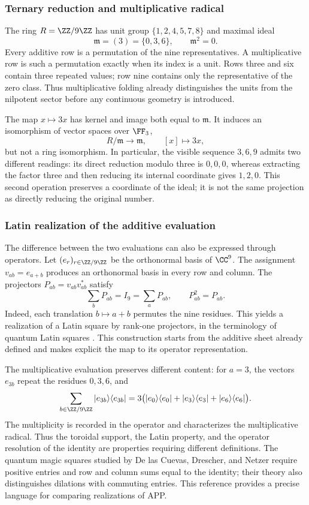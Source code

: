 \subsubsection{Ternary reduction and multiplicative radical}

The ring \(R=\ZZ/9\ZZ\) has unit group \(\{1,2,4,5,7,8\}\) and maximal ideal
\[
 \mathfrak m=(3)=\{0,3,6\},\qquad\mathfrak m^2=0.
\]
Every additive row is a permutation of the nine representatives. A multiplicative row is such a permutation exactly when its index is a unit. Rows three and six contain three repeated values; row nine contains only the representative of the zero class. Thus multiplicative folding already distinguishes the units from the nilpotent sector before any continuous geometry is introduced.

The map \(x\mapsto3x\) has kernel and image both equal to \(\mathfrak m\). It induces an isomorphism of vector spaces over \(\FF_3\),
\[
 R/\mathfrak m\longrightarrow\mathfrak m,\qquad [x]\longmapsto3x,
\]
but not a ring isomorphism. In particular, the visible sequence \(3,6,9\) admits two different readings: its direct reduction modulo three is \(0,0,0\), whereas extracting the factor three and then reducing its internal coordinate gives \(1,2,0\). This second operation preserves a coordinate of the ideal; it is not the same projection as directly reducing the original number.

\subsubsection{Latin realization of the additive evaluation}

The difference between the two evaluations can also be expressed through
operators. Let \((e_r)_{r\in\ZZ/9\ZZ}\) be the orthonormal basis of \(\CC^9\).
The assignment \(v_{ab}=e_{a+b}\) produces an orthonormal basis in every row
and column. The projectors \(P_{ab}=v_{ab}v_{ab}^{*}\) satisfy
\[
 \sum_bP_{ab}=I_9=\sum_aP_{ab},\qquad P_{ab}^2=P_{ab}.
\]
Indeed, each translation \(b\mapsto a+b\) permutes the nine residues.
This yields a realization of a Latin square by rank-one projectors,
in the terminology of quantum Latin squares
\cite{mustovicary,delascuevas2023}. This construction starts from the
additive sheet already defined and makes explicit the map to its operator representation.

The multiplicative evaluation preserves different content: for \(a=3\), the
vectors \(e_{3b}\) repeat the residues \(0,3,6\), and
\[
 \sum_{b\in\ZZ/9\ZZ}|e_{3b}\rangle\langle e_{3b}|
 =3\bigl(|e_0\rangle\langle e_0|+|e_3\rangle\langle e_3|
                    +|e_6\rangle\langle e_6|\bigr).
\]
The multiplicity is recorded in the operator and characterizes the multiplicative
radical. Thus the toroidal support, the Latin property, and the operator
resolution of the identity are properties requiring different definitions.
The quantum magic squares studied by De las Cuevas, Drescher, and Netzer
require positive entries and row and column sums equal to the identity;
their theory also distinguishes dilations with commuting entries\cite{delascuevas2020}.
This reference provides a precise language for comparing realizations of APP.


